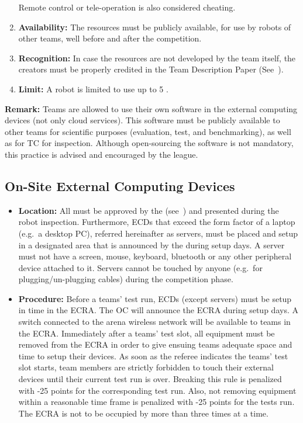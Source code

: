 \begin{enumerate}
	  Remote control or tele-operation is also considered cheating.
	\item \textbf{Availability:} The resources must be publicly available, for use by robots of other teams, well before and after the competition.
	\item \textbf{Recognition:} In case the resources are not developed by the team itself, the creators must be properly credited in the Team Description Paper (See~).
	\item \textbf{Limit:} A robot is limited to use up to 5 .
\end{enumerate}

\textbf{Remark:} Teams are allowed to use their own software in the external computing devices (not only cloud services). This software must be publicly available to other teams for scientific purposes (evaluation, test, and benchmarking), as well as for TC for inspection. Although open-sourcing the software is not mandatory, this practice is advised and encouraged by the league.

\subsection{On-Site External Computing Devices}
\label{rule:robot_external_computing_devices}

\begin{itemize}
  \item \textbf{Location:} All  must be approved by the 
  		(see~) and presented during the robot inspection. Furthermore, ECDs
  		that exceed the form factor of a laptop (e.g.~a desktop PC), referred hereinafter as servers, must be placed and
  		setup in a designated area that is announced by the  during setup days.
  		A server must not have a screen, mouse, keyboard, bluetooth or any other peripheral device attached to it.
  		Servers cannot be touched by anyone (e.g.~for plugging/un-plugging cables) during the competition phase.
  \item \textbf{Procedure:} Before a teams' test run, ECDs (except servers) must be setup in time in the
		 {ECRA}. The OC will announce the
        ECRA during setup days. A switch connected to the arena wireless network will be available to teams in the ECRA.
  		Immediately after a teams' test slot, all equipment must be removed from the ECRA in order to give ensuing
        teams adequate space and time to setup their devices. As soon as the referee indicates the teams' test slot
        starts, team members are strictly forbidden to touch their external devices until their current test run is over.
        Breaking this  rule is penalized with -25 points for the corresponding test run. Also, not removing
        equipment within a reasonable time frame is penalized with -25 points for the tests run. The ECRA is not to be
		occupied by more than three times at a time.
\end{itemize}


